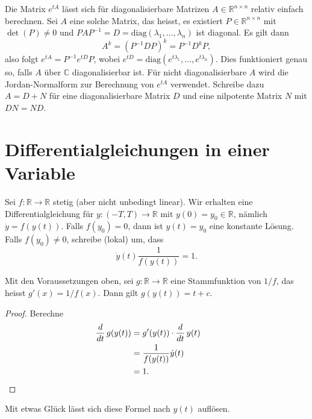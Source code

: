 \documentclass[../main.tex]{subfiles}
\begin{document}
\begin{remark}
Die Matrix $e^{tA}$ lässt sich für diagonalisierbare
Matrizen $A \in \mathbb{R}^{n \times n}$ relativ einfach
berechnen. Sei $A$ eine solche Matrix, das heisst,
es existiert $P \in \mathbb{R}^{n \times n}$
mit
$\det(P) \neq 0$ und $PAP^{-1} = D = \text{diag}(\lambda_1, \dots, \lambda_n)$ 
ist diagonal.
Es gilt dann
\[
A^k = {(P^{-1}DP)}^k = P^{-1}D^k P,
\]
also folgt $e^{tA} = P^{-1}e^{tD}P$, wobei
$e^{tD} = \text{diag}(e^{t\lambda_1}, \dots, e^{t \lambda_n})$.
Dies funktioniert genau so, falls $A$ über $\mathbb{C}$ 
diagonalisierbar ist.
Für nicht diagonalisierbare $A$ wird die Jordan-Normalform
zur Berechnung von $e^{tA}$ verwendet.
Schreibe dazu $A = D + N$ für eine diagonalisierbare
Matrix $D$ und eine nilpotente Matrix $N$ mit
$DN = ND$.
\end{remark}

\section{Differentialgleichungen in einer Variable}
Sei $f \colon \mathbb{R} \to \mathbb{R}$ stetig
(aber nicht unbedingt linear).
Wir erhalten eine Differentialgleichung
für $y \colon (-T, T) \to \mathbb{R}$ 
mit $y(0) = y_0 \in \mathbb{R}$,
nämlich $\dot y = f(y(t))$.
Falls $f(y_0) = 0$, dann ist
$y(t) = y_0$ eine konstante Lösung.
Falls $f(y_0) \neq 0$, schreibe (lokal) um, dass
\[
  \dot y(t) \frac{1}{f(y(t))} = 1.
\]

\begin{lemma*}
  Mit den Voraussetzungen oben,
  sei $g \colon \mathbb{R} \to \mathbb{R}$ eine Stammfunktion
  von $1/f$, das heisst $g'(x) = 1/f(x)$.
  Dann gilt $g(y(t)) = t + c$.
\end{lemma*}

\begin{proof}
  Berechne
  \begin{align*}
    \frac{d}{dt} \, g(y(t))
    &= g'(y(t)) \cdot \frac{d}{dt} \, y(t)\\
    &= \frac{1}{f(y(t))} \dot y(t) \\
    &= 1. && \qedhere
  \end{align*}
\end{proof}

Mit etwas Glück lässt sich diese Formel nach $y(t)$ auflösen.
\end{document}
